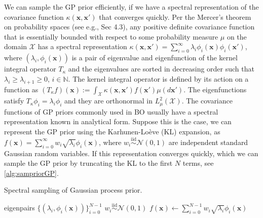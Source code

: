\documentclass{article}
\begin{document}
We can sample the GP prior efficiently, if we have a spectral representation of the covariance function $\kappa(\mathbf{x}, \mathbf{x}')$ that converges quickly.
Per the Mercer's theorem on probability spaces
(see e.g., \cite{Rasmussen2006} Sec 4.3), any positive definite covariance function that is essentially bounded with respect to some probability measure $\mu$ on the domain $\mathcal{X}$ has a spectral representation $\kappa(\mathbf{x}, \mathbf{x}') = \sum_{i=0}^\infty \lambda_i \phi_i(\mathbf{x}) \phi_i(\mathbf{x}')$,
where $(\lambda_i, \phi_i(\mathbf{x}))$ is a pair of eigenvalue and
eigenfunction of the kernel integral operator $T_\kappa$ and the
eigenvalues are sorted in decreasing order such that
$\lambda_i \ge \lambda_{i+1} \ge 0$, $i \in \mathbb{N}$. The kernel
integral operator is defined by its action on a function as
$(T_\kappa f)(\mathbf{x}) := \int_{\mathcal{X}} \kappa(\mathbf{x}, \mathbf{x}') f(\mathbf{x}') \mu(d \mathbf{x}')$.
The eigenfunctions satisfy $T_\kappa \phi_i = \lambda_i \phi_i$ and
they are orthonormal in $L^2_\mu(\mathcal{X})$. The covariance
functions of GP priors commonly used in BO usually
have a spectral representation known in analytical form.
Suppose this is the case, we can represent the GP prior using the  Karhunen-Loève (KL) expansion, as  $f(\mathbf{x}) = \sum_{i=0}^{\infty} w_i \sqrt{\lambda_i} \phi_i(\mathbf{x})$, where  $w_i \overset{\text{iid}}{\sim} \mathcal{N}(0,1)$ are independent standard Gaussian random variables.
If this representation converges quickly, which we can sample the GP prior by truncating the KL to the first $N$ terms, see \cref{alg:sampriorGP}.

\begin{algorithm}[t]
	\caption{Spectral sampling of Gaussian process prior.}
	\label{alg:sampriorGP}
	\begin{algorithmic}[1] %
		\Input  eigenpairs
		$\{(\lambda_i, \phi_i(\mathbf{x}))\}_{i=0}^{N-1}$
		\State $w_i \overset{\text{iid}}{\sim} \mathcal{N}(0,1)$
		\State \Return $f(\mathbf{x}) \gets \sum_{i=0}^{N-1} w_i \sqrt{\lambda_i} \phi_i(\mathbf{x})$
	\end{algorithmic}
\end{algorithm}
\end{document}
